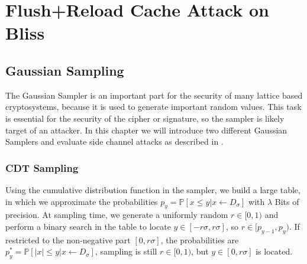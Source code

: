 %
%

\chapter{Flush+Reload Cache Attack on Bliss}
\label{bliss}

\section{Gaussian Sampling} %
The Gaussian Sampler is an important part for the security of many lattice based cryptosystems, because it is used to generate important random values. This task is essential for the security of the cipher or signature, so the sampler is likely target of an attacker. In this chapter we will introduce two different Gaussian Samplers and evaluate side channel attacks as described in \cite{cryptoeprint:2016:300}.
\subsection{CDT Sampling}
Using the cumulative distribution function in the sampler, we build a large table, in which we approximate the probabilities $p_y=\mathbb{P}[x \le y| x \leftarrow D_\sigma ]$ with $\lambda$ Bits of precision. At sampling time, we generate a uniformly random $r \in [0,1)$ and perform a binary search in the table to locate $y \in [-r\sigma, r\sigma]$, so $r \in [p_{y-1}, p_y)$. If restricted to the non-negative part $[0, r\sigma]$, the probabilities are $p^*_y = \mathbb{P}[|x| \le y| x \leftarrow D_\sigma]$, sampling is still $r \in [0,1)$, but $y \in [0, r \sigma]$ is located. 

